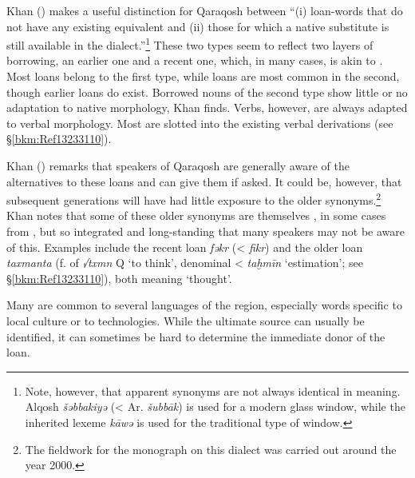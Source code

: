 \documentclass[output=paper]{langsci/langscibook}
\begin{document}
 Khan (\citeyear[516]{Khan2002}) makes a useful distinction for  Qaraqosh between “(i) loan-words that do not have any existing  equivalent and (ii) those for which a native  substitute is still available in the dialect.”\footnote{Note, however, that apparent synonyms are not always identical in meaning.  Alqosh \textit{šəbbakiyə} (< Ar. \textit{šubbāk}) is used for a modern glass window, while the inherited lexeme \textit{kāwə} is used for the traditional type of window.} These two types seem to reflect two layers of borrowing, an earlier one and a recent one, which, in many cases, is akin to . Most  loans belong to the first type, while  loans are most common in the second, though earlier loans do exist. Borrowed  nouns of the second type show little or no adaptation to native morphology, Khan finds. Verbs, however, are always adapted to  verbal morphology. Most are slotted into the existing  verbal derivations (see §\ref{bkm:Ref13233110}).

Khan (\citeyear[516]{Khan2002}) remarks that speakers of  Qaraqosh are generally aware of the  alternatives to these  loans and can give them if asked. It could be, however, that subsequent generations will have had little exposure to the older synonyms.\footnote{The fieldwork for the monograph on this dialect was carried out around the year 2000.} Khan notes that some of these older synonyms are themselves , in some cases from , but so integrated and long-standing that many speakers may not be aware of this. Examples include the recent  loan \textit{fəkr} (<  \textit{fikr}) and the older loan \textit{taxmanta} (f.  of  \textit{√txmn} Q ‘to think’, denominal <  \textit{taḫmīn} ‘estimation’; see §\ref{bkm:Ref13233110}), both meaning ‘thought’.

Many  are common to several languages of the region, especially words specific to local culture or to technologies. While the ultimate source can usually be identified, it can sometimes be hard to determine the immediate donor of the loan. 
\end{document}
